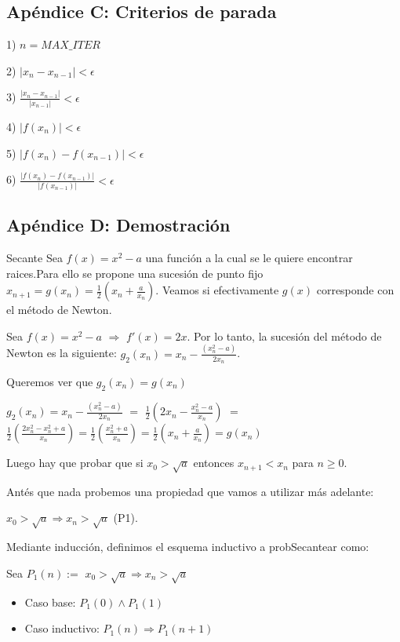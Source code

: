 \subsection{Apéndice C: Criterios de parada}

1) $n = MAX\_ITER$

2) $|x_{n} - x_{n-1}| < \epsilon$

3) $\frac{|x_{n} - x_{n-1}|}{|x_{n-1}|} < \epsilon$

4) $|f(x_{n})| < \epsilon$

5) $|f(x_{n})-f(x_{n-1})| < \epsilon$

6) $\frac{|f(x_{n}) - f(x_{n-1})|}{|f(x_{n-1})|} < \epsilon$

\vspace{2cm}

\subsection{Apéndice D: Demostración}
Secante
Sea $f(x) = x^2 -a$ una funci\'on a la cual se le quiere encontrar raices.Para ello se propone una sucesi\'on de punto fijo $x_{n+1} = g(x_n) = \frac{1}{2}\left(x_n+ \frac{a}{x_n}\right)$. Veamos si efectivamente $g(x)$ corresponde con el m\'etodo de Newton.

Sea $f(x) = x^2 - a$ $\Rightarrow$ $f'(x) = 2x$. Por lo tanto, la sucesi\'on del m\'etodo de Newton es la siguiente: $g_{2}(x_n) = x_n - \frac{(x_{n}^2 -a)}{2x_n}$. 

Queremos ver que $g_2(x_n)=g(x_n)$ 

$\displaystyle g_{2}(x_n) = \displaystyle x_n - \frac{(x_{n}^2 -a)}{2x_n}$ $=$ $\displaystyle \frac{1}{2}\left(2x_n - \frac{x_{n}^2 - a}{x_n}\right)$ $=$ $\displaystyle \frac{1}{2}\left(\frac{2x_{n}^2 -x_{n}^2 + a}{x_n}\right) = \frac{1}{2}\left(\frac{x_{n}^2 + a}{x_n}\right) = \frac{1}{2}\left(x_{n} + \frac{a}{x_n}\right) = g(x_n)$

Luego hay que probar que si $x_0 > \sqrt{a}$ entonces $x_{n+1} < x_n$ para $n \geq 0$.

Ant\'es que nada probemos una propiedad que vamos a utilizar m\'as adelante:

\hspace{6.5cm}$x_0 > \sqrt{a} \Rightarrow x_n > \sqrt{a}$ (P1). 

Mediante inducci\'on, definimos el esquema inductivo a probSecantear como:

Sea $P_1(n):=$ $x_0 > \sqrt{a} \Rightarrow x_n > \sqrt{a} $
\begin{itemize}
	\item Caso base: $P_1(0) \land P_1(1)$ 
	\item Caso inductivo: $P_1(n) \Rightarrow P_1(n+1)$
\end{itemize}

